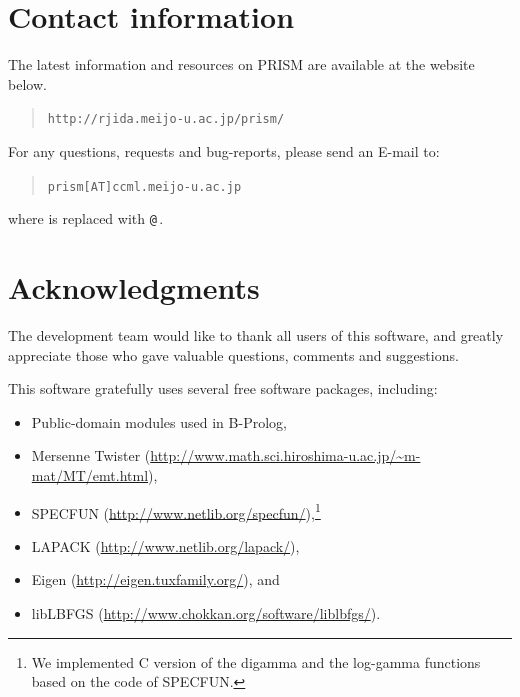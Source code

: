 \documentclass[a4paper]{report}
\makeatletter
\let\tts@ve\tt
\def\tt{\tts@ve\ifmmode\def\_{\mathchar`\_}\else\def\_{\char`\_}\fi}
\makeatother
\begin{document}
\section*{Contact information}
\label{contact}

The latest information and resources on PRISM are available at
the website below.
\begin{quote}
{\tt http://rjida.meijo-u.ac.jp/prism/}
\end{quote}
For any questions, requests and bug-reports, please send an E-mail to:
\begin{quote}
{\tt prism[AT]ccml.meijo-u.ac.jp}

\end{quote}
where {\tt [AT]} is replaced with \verb|@|\,.


\section*{Acknowledgments}


The development team would like to thank all users of this software,
and greatly appreciate those who gave valuable questions, comments and
suggestions.

This software gratefully uses several free software packages, including:
%
\begin{itemize}
\setlength{\parskip}{0pt}
\setlength{\itemsep}{2pt}
\item
  Public-domain modules used in B-Prolog,
\item
  Mersenne Twister
  (\url{http://www.math.sci.hiroshima-u.ac.jp/~m-mat/MT/emt.html}),
\item
  SPECFUN (\url{http://www.netlib.org/specfun/}),\footnote{
    We implemented C version of the digamma and the log-gamma functions
    based on the code of SPECFUN.
  }
\item
  LAPACK (\url{http://www.netlib.org/lapack/}),
\item
  Eigen (\url{http://eigen.tuxfamily.org/}), and
\item
  libLBFGS
  (\url{http://www.chokkan.org/software/liblbfgs/}).
\end{itemize}

\end{document}
